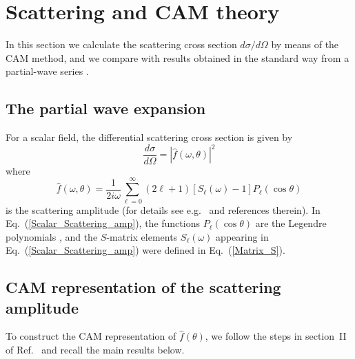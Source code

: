 \documentclass[aps,prd,longbibliography,reprint,twocolumn,amsmath,amssymb,amsfonts,showpacs,footnote,superscriptaddress]{revtex4-1}%
\begin{document}
\section{Scattering and CAM theory} \label{sec:CAM}
In this section we calculate the scattering cross section $d\sigma / d\Omega$ by means of the CAM method, and we compare with results obtained in the standard way from a partial-wave series \cite{Dolan:2017rtj}.

\subsection{The partial wave expansion} \label{subsec:partial}

For a scalar field, the differential scattering cross section is given by
\begin{equation}\label{Scalar_Scattering_diff}
  \frac{d\sigma}{d\Omega} = |\hat{f}(\omega,\theta)|^2
\end{equation}
where
\begin{equation}\label{Scalar_Scattering_amp}
 \hat{f}(\omega,\theta) = \frac{1}{2 i \omega} \sum_{\ell = 0}^{\infty} (2\ell+1)[S_{\ell}(\omega)-1]P_{\ell}(\cos\theta)
\end{equation}
is the scattering amplitude (for details see e.g.~\cite{Dolan:2017rtj} and references therein).  In Eq.~(\ref{Scalar_Scattering_amp}), the functions $P_{\ell}(\cos\theta)$ are the Legendre polynomials \cite{AS65}, and the $S$-matrix elements $S_{\ell}(\omega)$ appearing in Eq.~(\ref{Scalar_Scattering_amp}) were defined in Eq.~(\ref{Matrix_S}).

\subsection{CAM representation of the scattering amplitude}
\label{SecIIc}


To construct the CAM representation of $\hat{f}(\theta)$, we follow the steps in section~II of Ref.~\cite{Folacci:2019cmc} and recall the main results below.
\end{document}
